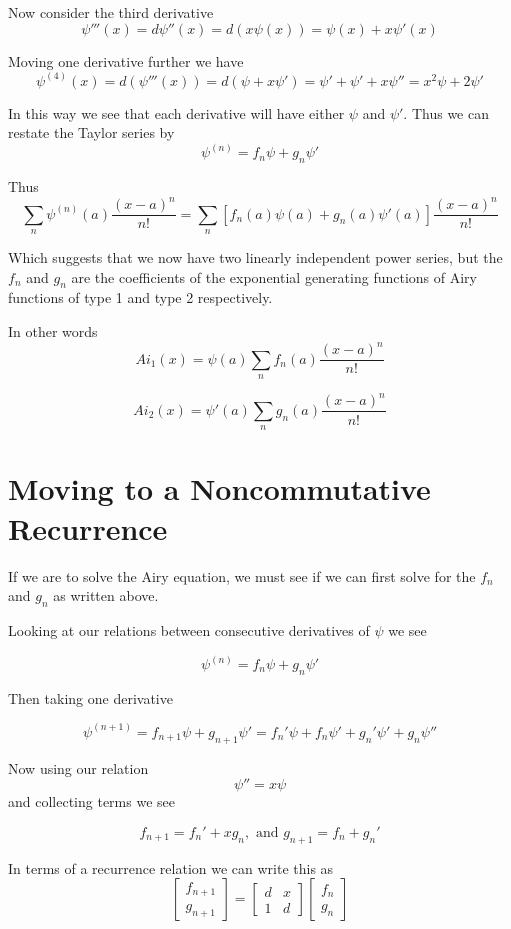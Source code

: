 \documentclass{amsart}
\theoremstyle{definition}
\theoremstyle{remark}
\numberwithin{equation}{section}
\begin{document}
Now consider the third derivative
\[
\psi'''(x) = d\psi''(x) = d(x\psi(x)) = \psi(x)+ x\psi'(x)
\]


Moving one derivative further we have
\[
\psi^{(4)}(x) = d(\psi'''(x)) = d(\psi + x\psi') = \psi' + \psi' +x\psi'' = x^2 \psi + 2\psi'
\]


In this way we see that each derivative will have either $\psi$ and $\psi'$.  Thus we can restate the Taylor series by
\[
\psi^{(n)} = f_n \psi + g_n \psi'
\]

Thus
\[
\sum_n \psi^{(n)}(a) \frac{(x-a)^n}{n!} = \sum_n [f_n(a) \psi(a)+g_n(a)\psi'(a)]\frac{(x-a)^n}{n!}
\]

Which suggests that we now have two linearly independent power series, but the $f_n$ and $g_n$ are the coefficients of the exponential generating functions of Airy functions of type 1 and type 2 respectively.


In other words
\[
Ai_1(x) = \psi(a) \sum_n f_n(a)\frac{(x-a)^n}{n!} 
\]

\[
Ai_2(x) = \psi'(a) \sum_n g_n(a)\frac{(x-a)^n}{n!}
\]

\section{Moving to a Noncommutative Recurrence}

If we are to solve the Airy equation, we must see if we can first solve for the $f_n$ and $g_n$ as written above.

Looking at our relations between consecutive derivatives of $\psi$ we see

\[
\psi^{(n)} = f_n \psi + g_n \psi'
\]

Then taking one derivative

\[
\psi^{(n+1)} = f_{n+1}\psi + g_{n+1}\psi' = f_n' \psi + f_n \psi' + g_n' \psi' + g_n \psi''
\]

Now using our relation
\[
\psi'' = x\psi
\]
and collecting terms we see

\[
f_{n+1} = f_n'+xg_n, \text{ and } g_{n+1} = f_n + g_n'
\]


In terms of a recurrence relation we can write this as
\begin{equation}
\begin{bmatrix}
f_{n+1} \\ g_{n+1} 
\end{bmatrix} = \begin{bmatrix}
d & x\\ 
1 & d
\end{bmatrix}
\begin{bmatrix}
f_n \\ g_n
\end{bmatrix}
\end{equation}
\end{document}
